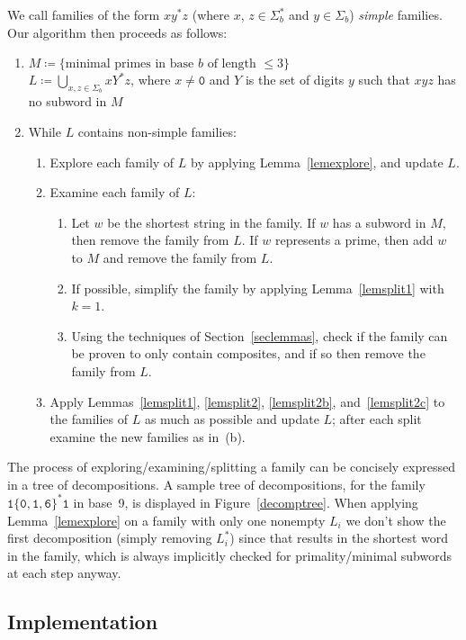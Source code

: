 \documentclass[12pt]{article}
\theoremstyle{plain}
\theoremstyle{definition}
\newcommand{\0}{\mathtt{0}}
\newcommand{\1}{\mathtt{1}}
\newcommand{\2}{\mathtt{2}}
\newcommand{\3}{\mathtt{3}}
\newcommand{\4}{\mathtt{4}}
\newcommand{\5}{\mathtt{5}}
\newcommand{\6}{\mathtt{6}}
\newcommand{\7}{\mathtt{7}}
\newcommand{\8}{\mathtt{8}}
\newcommand{\9}{\mathtt{9}}
\begin{document}
We call families of the form $xy^*z$ (where $x$, $z\in\Sigma_b^*$ and $y\in\Sigma_b$) \emph{simple} families.
Our algorithm then proceeds as follows:
\begin{enumerate}
\item $M\coloneqq\{\text{minimal primes in base $b$ of length $\leq3$}\}$ \\
$L\coloneqq\bigcup_{x,z\in\Sigma_b}xY^*z$, where $x\neq\0$ and $Y$ is the set of digits $y$ such that $xyz$ has no subword in $M$
\item While $L$ contains non-simple families:
\begin{enumerate}
\item Explore each family of $L$ by applying Lemma~\ref{lemexplore}, and update $L$.
\item Examine each family of $L$:
\begin{enumerate}
\item Let $w$ be the shortest string in the family.  If $w$ has a subword in $M$, then remove the family from $L$.
If $w$ represents a prime, then add $w$ to $M$ and remove the family from $L$.
\item If possible, simplify the family by applying Lemma~\ref{lemsplit1} with $k=1$.
\item Using the techniques of Section~\ref{seclemmas}, check if the family can be proven to only contain
composites, and if so then remove the family from $L$.
\end{enumerate}
\item Apply Lemmas~\ref{lemsplit1}, \ref{lemsplit2}, \ref{lemsplit2b}, and~\ref{lemsplit2c} to the families of $L$ as much
as possible and update $L$; after each split examine the new families as in~(b).
\end{enumerate}
\end{enumerate}

The process of exploring/examining/splitting a family can be concisely expressed in a tree of decompositions.
A sample tree of decompositions, for the family $\1\{\0,\1,\6\}^*\1$ in base~9, is displayed in Figure~\ref{decomptree}.
When applying Lemma~\ref{lemexplore} on a family with only one nonempty $L_i$ we don't show the first decomposition
(simply removing $L_i^*$) since that results in the shortest word in the family, which is always implicitly
checked for primality/minimal subwords at each step anyway.

\subsection{Implementation}
\end{document}
